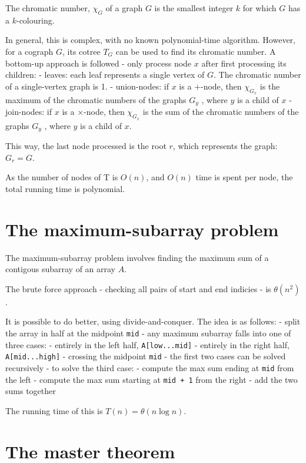 \documentclass[11pt]{article}
\begin{document}
The chromatic number, \(\chi_G\) of a graph \(G\) is the smallest
integer \(k\) for which \(G\) has a \(k\)-colouring.

In general, this is complex, with no known polynomial-time algorithm.
However, for a cograph \(G\), its cotree \(T_G\) can be used to find its
chromatic number. A bottom-up approach is followed - only process node
\(x\) after first processing its children: - leaves: each leaf
represents a single vertex of \(G\). The chromatic number of a
single-vertex graph is 1. - union-nodes: if \(x\) is a \(+\)-node, then
\(\chi_{G_x}\) is the maximum of the chromatic numbers of the graphs
\(G_y\) , where \(y\) is a child of \(x\) - join-nodes: if \(x\) is a
\(\times\)-node, then \(\chi_{G_x}\) is the sum of the chromatic numbers
of the graphs \(G_y\) , where \(y\) is a child of \(x\).

This way, the last node processed is the root \(r\), which represents
the graph: \(G_r = G\).

As the number of nodes of T is \(O(n)\), and \(O(n)\) time is spent per
node, the total running time is polynomial.

    \section{The maximum-subarray
problem}\label{the-maximum-subarray-problem}

The maximum-subarray problem involves finding the maximum sum of a
contigous subarray of an array \(A\).

The brute force approach - checking all pairs of start and end indicies
- is \(\theta(n^2)\).

It is possible to do better, using divide-and-conquer. The idea is as
follows: - split the array in half at the midpoint \texttt{mid} - any
maximum subarray falls into one of three cases: - entirely in the left
half, \texttt{A{[}low...mid{]}} - entirely in the right half,
\texttt{A{[}mid...high{]}} - crossing the midpoint \texttt{mid} - the
first two cases can be solved recursively - to solve the third case: -
compute the max sum ending at \texttt{mid} from the left - compute the
max sum starting at \texttt{mid\ +\ 1} from the right - add the two sums
together

The running time of this is \(T(n) = \theta(n \log n)\).

    \section{The master theorem}\label{the-master-theorem}
\end{document}
